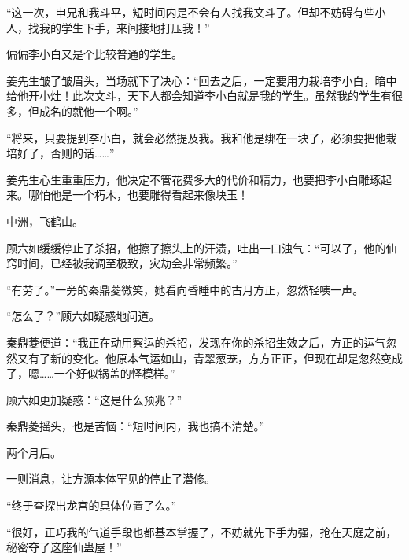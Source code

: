 \begin{this_body}
“这一次，申兄和我斗平，短时间内是不会有人找我文斗了。但却不妨碍有些小人，找我的学生下手，来间接地打压我！”

偏偏李小白又是个比较普通的学生。

姜先生皱了皱眉头，当场就下了决心：“回去之后，一定要用力栽培李小白，暗中给他开小灶！此次文斗，天下人都会知道李小白就是我的学生。虽然我的学生有很多，但成名的就他一个啊。”

“将来，只要提到李小白，就会必然提及我。我和他是绑在一块了，必须要把他栽培好了，否则的话……”

姜先生心生重重压力，他决定不管花费多大的代价和精力，也要把李小白雕琢起来。哪怕他是一个朽木，也要雕得看起来像块玉！

中洲，飞鹤山。

顾六如缓缓停止了杀招，他擦了擦头上的汗渍，吐出一口浊气：“可以了，他的仙窍时间，已经被我调至极致，灾劫会非常频繁。”

“有劳了。”一旁的秦鼎菱微笑，她看向昏睡中的古月方正，忽然轻咦一声。

“怎么了？”顾六如疑惑地问道。

秦鼎菱便道：“我正在动用察运的杀招，发现在你的杀招生效之后，方正的运气忽然又有了新的变化。他原本气运如山，青翠葱茏，方方正正，但现在却是忽然变成了，嗯……一个好似锅盖的怪模样。”

顾六如更加疑惑：“这是什么预兆？”

秦鼎菱摇头，也是苦恼：“短时间内，我也搞不清楚。”

两个月后。

一则消息，让方源本体罕见的停止了潜修。

“终于查探出龙宫的具体位置了么。”

“很好，正巧我的气道手段也都基本掌握了，不妨就先下手为强，抢在天庭之前，秘密夺了这座仙蛊屋！”

\end{this_body}

